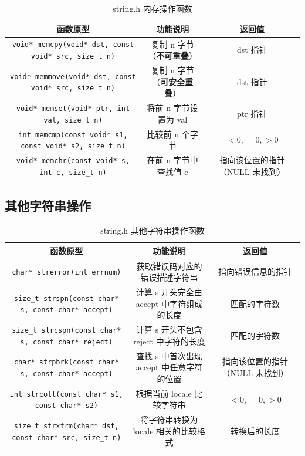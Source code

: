 \begin{table}[H]
\centering
\small
\renewcommand{\arraystretch}{1.6}
\begin{tabulary}{\linewidth}{CCC}
\toprule
\textbf{函数原型} & \textbf{功能说明} & \textbf{返回值} \\ \midrule
\texttt{void* memcpy(void* dst, const void* src, size\_t n)} & 复制 n 字节（\textbf{不可重叠}） & dst 指针 \\ 
\texttt{void* memmove(void* dst, const void* src, size\_t n)} & 复制 n 字节（\textbf{可安全重叠}） & dst 指针 \\ 
\texttt{void* memset(void* ptr, int val, size\_t n)} & 将前 n 字节设置为 val & ptr 指针 \\ 
\texttt{int memcmp(const void* s1, const void* s2, size\_t n)} & 比较前 n 个字节 & $<0, =0, >0$ \\ 
\texttt{void* memchr(const void* s, int c, size\_t n)} & 在前 n 字节中查找值 c & 指向该位置的指针（NULL 未找到） \\ \bottomrule
\end{tabulary}
\caption{string.h 内存操作函数}
\label{tab:string_mem}
\end{table}

\subsection{其他字符串操作}

\begin{table}[H]
\centering
\small
\renewcommand{\arraystretch}{1.5}
\begin{tabulary}{\linewidth}{CCC}
\toprule
\textbf{函数原型} & \textbf{功能说明} & \textbf{返回值} \\ \midrule
\texttt{char* strerror(int errnum)} & 获取错误码对应的错误描述字符串 & 指向错误信息的指针 \\ 
\texttt{size\_t strspn(const char* s, const char* accept)} & 计算 s 开头完全由 accept 中字符组成的长度 & 匹配的字符数 \\ 
\texttt{size\_t strcspn(const char* s, const char* reject)} & 计算 s 开头不包含 reject 中字符的长度 & 匹配的字符数 \\ 
\texttt{char* strpbrk(const char* s, const char* accept)} & 查找 s 中首次出现 accept 中任意字符的位置 & 指向该位置的指针（NULL 未找到） \\ 
\texttt{int strcoll(const char* s1, const char* s2)} & 根据当前 locale 比较字符串 & $<0, =0, >0$ \\ 
\texttt{size\_t strxfrm(char* dst, const char* src, size\_t n)} & 将字符串转换为 locale 相关的比较格式 & 转换后的长度 \\ \bottomrule
\end{tabulary}
\caption{string.h 其他字符串操作函数}
\label{tab:string_other}
\end{table}
